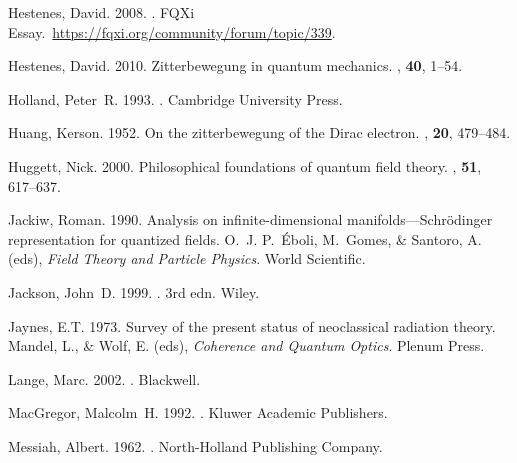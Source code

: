 \documentclass[onecolumn,secnumarabic,amsmath,amssymb,balancelastpage,nofootinbib]{article}
\begin{document}
\begin{thebibliography}{}
Hestenes, David. 2008.
.
\newblock FQXi Essay.\ \url{https://fqxi.org/community/forum/topic/339}.

Hestenes, David. 2010.
\newblock Zitterbewegung in quantum mechanics.
, {\bf 40}, 1--54.

Holland, Peter~R. 1993.
.
\newblock Cambridge University Press.

Huang, Kerson. 1952.
\newblock On the zitterbewegung of the Dirac electron.
, {\bf 20}, 479--484.

Huggett, Nick. 2000.
\newblock Philosophical foundations of quantum field theory.
, {\bf 51},
  617--637.

Jackiw, Roman. 1990.
\newblock Analysis on infinite-dimensional manifolds---Schr\"{o}dinger
  representation for quantized fields.
 O.~J. P.~\'{E}boli, M.~Gomes, \& Santoro, A.
  (eds), {\em Field Theory and Particle Physics}.
\newblock World Scientific.

Jackson, John~D. 1999.
. 3rd edn.
\newblock Wiley.

Jaynes, E.T. 1973.
\newblock Survey of the present status of neoclassical radiation theory.
 Mandel, L., \& Wolf, E. (eds), {\em Coherence
  and Quantum Optics}.
\newblock Plenum Press.

Lange, Marc. 2002.
.
\newblock Blackwell.

MacGregor, Malcolm~H. 1992.
.
\newblock Kluwer Academic Publishers.

Messiah, Albert. 1962.
.
\newblock North-Holland Publishing Company.


\end{thebibliography}
\end{document}
